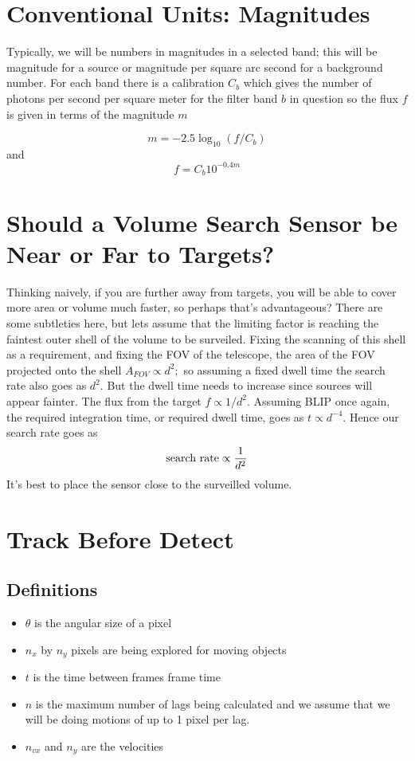 \documentclass[10pt]{article}
\begin{document}
\section{Conventional Units: Magnitudes}
Typically, we will be numbers in magnitudes in a selected band;
this will be magnitude for a source or magnitude per square arc
second for a background number. 
For each band there is a calibration $C_b$ which gives the number
of photons per second per square meter for the filter band $b$ in 
question so the flux $f$ is given in terms of the magnitude $m$

\begin{equation}
	m = -2.5 \log_{10}(f/C_b)
\end{equation}
and
\begin{equation}
f = C_b 10^{-0.4 m}
\end{equation}

\section{Should a Volume Search Sensor be
Near or Far to Targets?}
Thinking naively, if you are further away
from targets, you will be able to cover more area or volume much faster, so perhaps that's advantageous?   
There are some subtleties here, but lets assume that the limiting factor is reaching the faintest outer shell of the volume to be surveiled.  Fixing the scanning of this shell as a requirement, and fixing the FOV of the telescope, the area of the FOV projected onto the shell 
$ A_{FOV} \propto d^2;$ so assuming a fixed dwell time the search rate also goes as $d^2.$  But the dwell time
needs to increase since sources will appear fainter.
The flux from the target 
$f \propto 1/d^2.$ Assuming BLIP once again, the required
integration time, or required dwell time, goes as $t \propto d^{-4}.$  Hence our search rate goes as 
\begin{equation}
	\mathrm{search\ rate} \propto { 1\over d^2}
\end{equation}
It's best to place the sensor close to the surveilled volume.

\section{Track Before Detect}
\subsection{Definitions}
\begin{itemize}
	\item $\theta$ is the angular size of a pixel
	\item $n_x$ by $n_y$ pixels are being explored for moving objects
	\item $t$ is the time between frames frame time
	\item $n$ is the maximum number of lags being calculated
	and we assume that we will be doing motions of up to
	1 pixel per lag.
	\item $n_{vx}$ and $n_{y}$ are the velocities 
\end{itemize}
\end{document}
